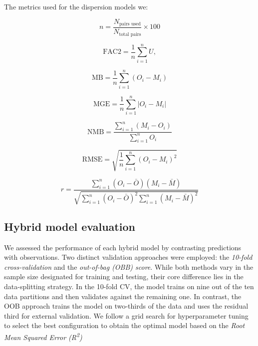 \documentclass{article}
\begin{document}
The metrics used for the dispersion models we:

\begin{equation}
n = \frac{N_{\text{pairs used}}}{N_{\text{total pairs}}} \times 100
\end{equation}

\begin{equation}
\text{FAC2} = \frac{1}{n} \sum_{i=1}^{n} U,
\end{equation}

\begin{equation}
\text{MB} = \frac{1}{n} \sum_{i=1}^{n} (O_i - M_i)
\end{equation}

\begin{equation}
\text{MGE} = \frac{1}{n} \sum_{i=1}^{n} |O_i - M_i|
\end{equation}

\begin{equation}
\text{NMB} = \frac{\sum_{i=1}^{n} (M_i - O_i)}{\sum_{i=1}^{n} O_i}
\end{equation}

\begin{equation}
\text{RMSE} = \sqrt{\frac{1}{n} \sum_{i=1}^{n} (O_i - M_i)^2}
\end{equation}

\begin{equation}
r = \frac{\sum_{i=1}^{n} (O_i - \bar{O})(M_i - \bar{M})}{\sqrt{\sum_{i=1}^{n} (O_i - \bar{O})^2 \sum_{i=1}^{n} (M_i - \bar{M})^2}}
\end{equation}
\vspace{0.5cm}

\subsection{Hybrid model evaluation}
We assessed the performance of each hybrid model by contrasting predictions with observations. Two distinct validation approaches were employed: the \textit{10-fold cross-validation} and the \textit{out-of-bag (OBB) score}. While both methods vary in the sample size designated for training and testing, their core difference lies in the data-splitting strategy. In the 10-fold CV, the model trains on nine out of the ten data partitions and then validates against the remaining one. In contrast, the OOB approach trains the model on two-thirds of the data and uses the residual third for external validation. We follow a grid search for hyperparameter tuning  to select the best configuration to obtain the optimal model based on the \textit{Root Mean Squared Error (R\textsuperscript{2})}
\end{document}

